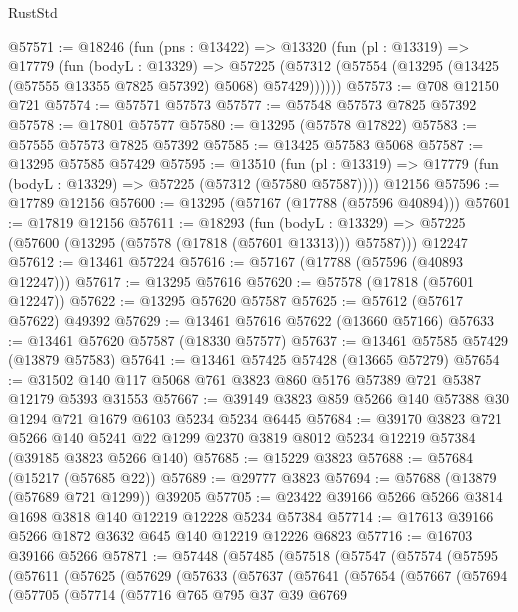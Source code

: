\begin{lexlean}{RustStd}
\begin{coremodule}
@57571 := @18246
    (fun (pns : @13422) =>
    @13320
      (fun (pl : @13319) =>
      @17779
        (fun (bodyL : @13329) =>
        @57225 (@57312 (@57554 (@13295 (@13425 (@57555 @13355 @7825 @57392) @5068) @57429))))))
@57573 := @708 @12150 @721
@57574 := @57571 @57573
@57577 := @57548 @57573 @7825 @57392
@57578 := @17801 @57577
@57580 := @13295 (@57578 @17822)
@57583 := @57555 @57573 @7825 @57392
@57585 := @13425 @57583 @5068
@57587 := @13295 @57585 @57429
@57595 := @13510
    (fun (pl : @13319) => @17779 (fun (bodyL : @13329) => @57225 (@57312 (@57580 @57587))))
    @12156
@57596 := @17789 @12156
@57600 := @13295 (@57167 (@17788 (@57596 @40894)))
@57601 := @17819 @12156
@57611 := @18293
    (fun (bodyL : @13329) => @57225 (@57600 (@13295 (@57578 (@17818 (@57601 @13313))) @57587)))
    @12247
@57612 := @13461 @57224
@57616 := @57167 (@17788 (@57596 (@40893 @12247)))
@57617 := @13295 @57616
@57620 := @57578 (@17818 (@57601 @12247))
@57622 := @13295 @57620 @57587
@57625 := @57612 (@57617 @57622) @49392
@57629 := @13461 @57616 @57622 (@13660 @57166)
@57633 := @13461 @57620 @57587 (@18330 @57577)
@57637 := @13461 @57585 @57429 (@13879 @57583)
@57641 := @13461 @57425 @57428 (@13665 @57279)
@57654 := @31502 @140 @117 @5068 @761 @3823 @860 @5176 @57389 @721 @5387 @12179 @5393 @31553
@57667 := @39149 @3823 @859 @5266 @140 @57388 @30 @1294 @721 @1679 @6103 @5234 @5234 @6445
@57684 := @39170
    @3823
    @721
    @5266
    @140
    @5241
    @22
    @1299
    @2370
    @3819
    @8012
    @5234
    @12219
    @57384
    (@39185 @3823 @5266 @140)
@57685 := @15229 @3823
@57688 := @57684 (@15217 (@57685 @22))
@57689 := @29777 @3823
@57694 := @57688 (@13879 (@57689 @721 @1299)) @39205
@57705 := @23422 @39166 @5266 @5266 @3814 @1698 @3818 @140 @12219 @12228 @5234 @57384
@57714 := @17613 @39166 @5266 @1872 @3632 @645 @140 @12219 @12226 @6823
@57716 := @16703 @39166 @5266
@57871 := @57448
    (@57485
      (@57518
        (@57547
          (@57574
            (@57595
              (@57611
                (@57625
                  (@57629
                    (@57633
                      (@57637
                        (@57641
                          (@57654
                            (@57667
                              (@57694
                                (@57705
                                  (@57714
                                    (@57716
                                      @765
                                      @795
                                      @37
                                      @39
                                      @6769

\end{coremodule}
\end{lexlean}
